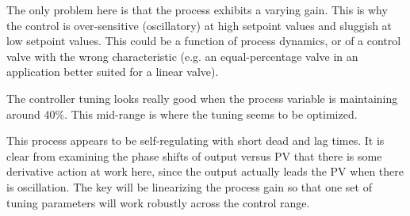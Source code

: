 \vskip 10pt

The only problem here is that the process exhibits a varying gain.  This is why the control is over-sensitive (oscillatory) at high setpoint values and sluggish at low setpoint values.  This could be a function of process dynamics, or of a control valve with the wrong characteristic (e.g. an equal-percentage valve in an application better suited for a linear valve).

\vskip 10pt
  
The controller tuning looks really good when the process variable is maintaining around 40\%.  This mid-range is where the tuning seems to be optimized.  

\vskip 10pt

This process appears to be self-regulating with short dead and lag times.  It is clear from examining the phase shifts of output versus PV that there is some derivative action at work here, since the output actually leads the PV when there is oscillation.  The key will be linearizing the process gain so that one set of tuning parameters will work robustly across the control range.












